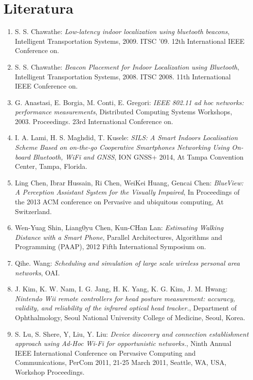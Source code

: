 \documentclass[a4paper]{article}
\begin{document}
\section{Literatura}
\begin{enumerate}[1.]
\item S. S. Chawathe: \textit{Low-latency indoor localization using bluetooth beacons}, Intelligent Transportation Systems, 2009. ITSC '09. 12th International IEEE Conference on.
\item S. S. Chawathe: \textit{Beacon Placement for Indoor Localization using Bluetooth},  Intelligent Transportation Systems, 2008. ITSC 2008. 11th International IEEE Conference on.
\item G. Anastasi, E. Borgia, M. Conti, E. Gregori: \textit{IEEE 802.11 ad hoc networks: performance measurements}, Distributed Computing Systems Workshops, 2003. Proceedings. 23rd International Conference on.
\item I. A. Lami, H. S. Maghdid, T. Kusele: \textit{SILS: A Smart Indoors Localisation Scheme Based on on-the-go Cooperative Smartphones Networking Using On-board Bluetooth, WiFi and GNSS}, ION GNSS+ 2014, At Tampa Convention Center, Tampa, Florida.
\item Ling Chen, Ibrar Hussain, Ri Chen, WeiKei Huang, Gencai Chen: \textit{BlueView: A Perception Assistant System for the Visually Impaired}, In Proceedings of the 2013 ACM conference on Pervasive and ubiquitous computing, At Switzerland.
\item Wen-Yuag Shin, Liang0yu Chen, Kun-CHan Lan: \textit{Estimating Walking Distance with a Smart Phone}, Parallel Architectures, Algorithms and Programming (PAAP), 2012 Fifth International Symposium on.
\item Qihe. Wang: \textit{Scheduling and simulation of large scale wireless personal area networks}, OAI.
\item J. Kim, K. W. Nam, I. G. Jang, H. K. Yang, K. G. Kim, J. M. Hwang: \textit{Nintendo Wii remote controllers for head posture measurement: accuracy, validity, and reliability of the infrared optical head tracker.}, Department of Ophthalmology, Seoul National University College of Medicine, Seoul, Korea.
\item S. Lu, S. Shere, Y, Liu, Y. Liu: \textit{Device discovery and connection establishment approach using Ad-Hoc Wi-Fi for opportunistic networks.}, Ninth Annual IEEE International Conference on Pervasive Computing and Communications, PerCom 2011, 21-25 March 2011, Seattle, WA, USA, Workshop Proceedings.
\end{enumerate}
\end{document}
